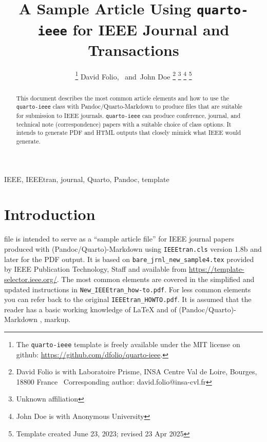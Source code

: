 \documentclass[
  journal,
]{IEEEtran}%
\title{A Sample Article Using \texttt{quarto-ieee} for IEEE Journal and
Transactions}
\author{
\thanks{The \texttt{quarto-ieee} template is freely available under the
MIT license on github: \url{https://github.com/dfolio/quarto-ieee}.}
David Folio\orcidlink{0000-0001-9430-6091},~\IEEEmembership{Member,
IEEE}
and~John Doe%
\thanks{David Folio is with Laboratoire Prisme, INSA Centre Val de
Loire, Bourges, 18800 France%
  Corresponding author: david.folio@insa-cvl.fr
}
\thanks{Unknown affiliation}
\thanks{John Doe is with Anonymous University%
}
\thanks{Template created June 23, 2023; revised 23 Apr 2025}
}
\theoremstyle{plain}
\theoremstyle{remark}
\begin{document}


\maketitle

\begin{abstract}
This document describes the most common article elements and how to use
the \texttt{quarto-ieee} class with Pandoc/Quarto-Markdown to produce
files that are suitable for submission to IEEE journals.
\texttt{quarto-ieee} can produce conference, journal, and technical note
(correspondence) papers with a suitable choice of class options. It
intends to generate PDF and HTML outputs that closely mimick what IEEE
would generate.
\end{abstract}
\begin{IEEEkeywords}
IEEE, IEEEtran, journal, Quarto, Pandoc, template
\end{IEEEkeywords}

%


\section{Introduction}\label{sec-intro}

 file is intended to serve as a ``sample article
file'' for IEEE journal papers produced with (Pandoc/Quarto)-Markdown
using \texttt{IEEEtran.cls} version 1.8b and later for the PDF output.
It is based on \texttt{bare\_jrnl\_new\_sample4.tex} provided by IEEE
Publication Technology, Staff and available from
\url{https://template-selector.ieee.org/}. The most common elements are
covered in the simplified and updated instructions in
\texttt{New\_IEEEtran\_how-to.pdf}. For less common elements you can
refer back to the original \texttt{IEEEtran\_HOWTO.pdf}. It is assumed
that the reader has a basic working knowledge of {\LaTeX}
 and of
(Pandoc/Quarto)-Markdown ,
 markup.
\end{document}
